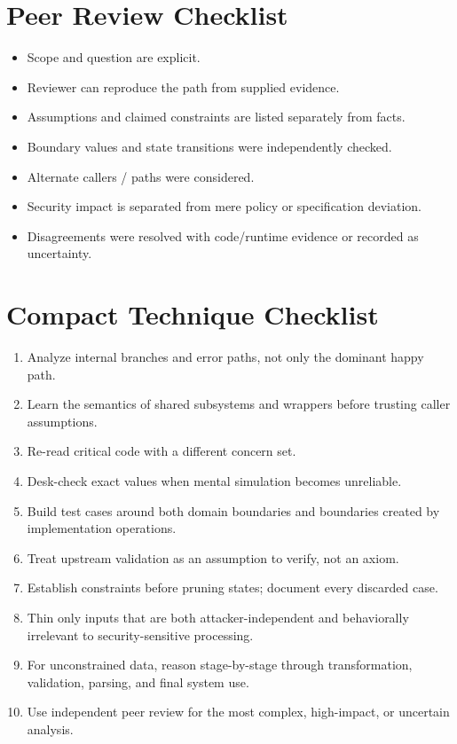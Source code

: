 \documentclass[10pt]{article}
\newcommand{\checkbox}{\ensuremath{\square}}
\begin{document}
\section{Peer Review Checklist}
\begin{itemize}
\item[\checkbox] Scope and question are explicit.
\item[\checkbox] Reviewer can reproduce the path from supplied evidence.
\item[\checkbox] Assumptions and claimed constraints are listed separately from facts.
\item[\checkbox] Boundary values and state transitions were independently checked.
\item[\checkbox] Alternate callers / paths were considered.
\item[\checkbox] Security impact is separated from mere policy or specification deviation.
\item[\checkbox] Disagreements were resolved with code/runtime evidence or recorded as uncertainty.
\end{itemize}

\section{Compact Technique Checklist}
\begin{enumerate}
\item Analyze internal branches and error paths, not only the dominant happy path.
\item Learn the semantics of shared subsystems and wrappers before trusting caller assumptions.
\item Re-read critical code with a different concern set.
\item Desk-check exact values when mental simulation becomes unreliable.
\item Build test cases around both domain boundaries and boundaries created by implementation operations.
\item Treat upstream validation as an assumption to verify, not an axiom.
\item Establish constraints before pruning states; document every discarded case.
\item Thin only inputs that are both attacker-independent and behaviorally irrelevant to security-sensitive processing.
\item For unconstrained data, reason stage-by-stage through transformation, validation, parsing, and final system use.
\item Use independent peer review for the most complex, high-impact, or uncertain analysis.
\end{enumerate}
\end{document}
